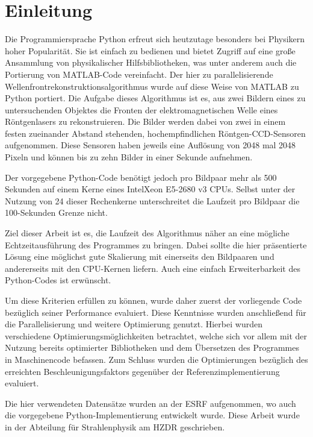 \chapter{Einleitung}

Die Programmiersprache Python erfreut sich heutzutage besonders bei Physikern hoher Popularität. Sie ist einfach zu bedienen und bietet Zugriff auf eine große Ansammlung von physikalischer Hilfsbibliotheken, was unter anderem auch die Portierung von MATLAB-Code vereinfacht. Der hier zu parallelisierende Wellenfrontrekonstruktionsalgorithmus wurde auf diese Weise von MATLAB zu Python portiert. Die Aufgabe dieses Algorithmus ist es, aus zwei Bildern eines zu untersuchenden Objektes die Fronten der elektromagnetischen Welle eines Röntgenlasers zu rekonstruieren. Die Bilder werden dabei von zwei in einem festen zueinander Abstand stehenden, hochempfindlichen Röntgen-\gls{CCD}-Sensoren aufgenommen. Diese Sensoren haben jeweils eine Auflösung von 2048 mal 2048 Pixeln und können bis zu zehn Bilder in einer Sekunde aufnehmen. 

Der vorgegebene Python-Code benötigt jedoch pro Bildpaar mehr als 500 Sekunden auf einem Kerne eines Intel\textregistered \mbox{Xeon\textregistered} E5-2680 v3 \glspl{CPU}. Selbst unter der Nutzung von 24 dieser Rechenkerne unterschreitet die Laufzeit pro Bildpaar die 100-Sekunden Grenze nicht.

Ziel dieser Arbeit ist es, die Laufzeit des Algorithmus näher an eine mögliche Echtzeitausführung des Programmes zu bringen. Dabei sollte die hier präsentierte Lösung eine möglichst gute Skalierung mit einerseits den Bildpaaren und andererseits mit den \gls{CPU}-Kernen liefern. Auch eine einfach Erweiterbarkeit des Python-Codes ist erwünscht. 

Um diese Kriterien erfüllen zu können, wurde daher zuerst der vorliegende Code bezüglich seiner Performance evaluiert. Diese Kenntnisse wurden anschließend für die Parallelisierung und weitere Optimierung genutzt. Hierbei wurden verschiedene Optimierungsmöglichkeiten betrachtet, welche sich vor allem mit der Nutzung bereits optimierter Bibliotheken und dem Übersetzen des Programmes in Maschinencode befassen. Zum Schluss wurden die Optimierungen bezüglich des erreichten Beschleunigungsfaktors gegenüber der Referenzimplementierung evaluiert.

Die hier verwendeten Datensätze wurden an der \gls{ESRF} aufgenommen, wo auch die vorgegebene Python-Implementierung entwickelt wurde. Diese Arbeit wurde in der Abteilung für Strahlenphysik am \gls{HZDR} geschrieben. 








